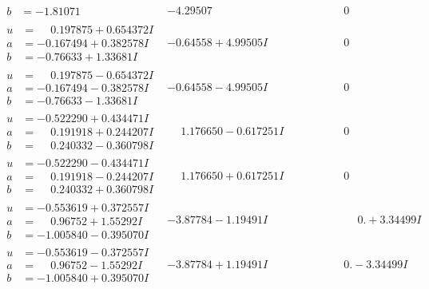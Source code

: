 \documentclass[1p]{elsarticle_modified}
\theoremstyle{definition}
\begin{document}
$$\begin{array}{c|c|c}
\begin{aligned}
b &= -1.81071\phantom{ +0.000000I}\end{aligned}
 & -4.29507\phantom{ +0.000000I} & \phantom{-0.000000 } 0 \\ \hline\begin{aligned}
u &= \phantom{-}0.197875 + 0.654372 I \\
a &= -0.167494 + 0.382578 I \\
b &= -0.76633 + 1.33681 I\end{aligned}
 & -0.64558 + 4.99505 I & \phantom{-0.000000 } 0 \\ \hline\begin{aligned}
u &= \phantom{-}0.197875 - 0.654372 I \\
a &= -0.167494 - 0.382578 I \\
b &= -0.76633 - 1.33681 I\end{aligned}
 & -0.64558 - 4.99505 I & \phantom{-0.000000 } 0 \\ \hline\begin{aligned}
u &= -0.522290 + 0.434471 I \\
a &= \phantom{-}0.191918 + 0.244207 I \\
b &= \phantom{-}0.240332 - 0.360798 I\end{aligned}
 & \phantom{-}1.176650 - 0.617251 I & \phantom{-0.000000 } 0 \\ \hline\begin{aligned}
u &= -0.522290 - 0.434471 I \\
a &= \phantom{-}0.191918 - 0.244207 I \\
b &= \phantom{-}0.240332 + 0.360798 I\end{aligned}
 & \phantom{-}1.176650 + 0.617251 I & \phantom{-0.000000 } 0 \\ \hline\begin{aligned}
u &= -0.553619 + 0.372557 I \\
a &= \phantom{-}0.96752 + 1.55292 I \\
b &= -1.005840 - 0.395070 I\end{aligned}
 & -3.87784 - 1.19491 I & \phantom{-0.000000 -}0. + 3.34499 I \\ \hline\begin{aligned}
u &= -0.553619 - 0.372557 I \\
a &= \phantom{-}0.96752 - 1.55292 I \\
b &= -1.005840 + 0.395070 I\end{aligned}
 & -3.87784 + 1.19491 I & \phantom{-0.000000 } 0. - 3.34499 I \\ \hline\begin{aligned}

\end{aligned}
\end{array}$$
\end{document}
